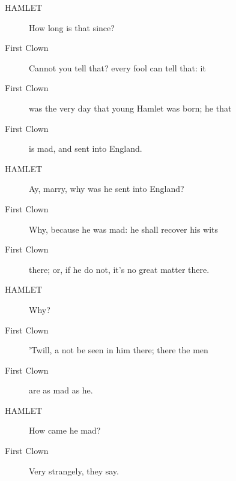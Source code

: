 \documentclass{article}
\begin{document}
\begin{description}
            
\item[HAMLET] How long is that since?
\end{description}
          
\begin{description}
            
\item[First Clown] Cannot you tell that? every fool can tell that: it
\item[First Clown] was the very day that young Hamlet was born; he that
\item[First Clown] is mad, and sent into England.
\end{description}
          
\begin{description}
            
\item[HAMLET] Ay, marry, why was he sent into England?
\end{description}
          
\begin{description}
            
\item[First Clown] Why, because he was mad: he shall recover his wits
\item[First Clown] there; or, if he do not, it's no great matter there.
\end{description}
          
\begin{description}
            
\item[HAMLET] Why?
\end{description}
          
\begin{description}
            
\item[First Clown] 'Twill, a not be seen in him there; there the men
\item[First Clown] are as mad as he.
\end{description}
          
\begin{description}
            
\item[HAMLET] How came he mad?
\end{description}
          
\begin{description}
            
\item[First Clown] Very strangely, they say.
\end{description}
          
\end{document}
